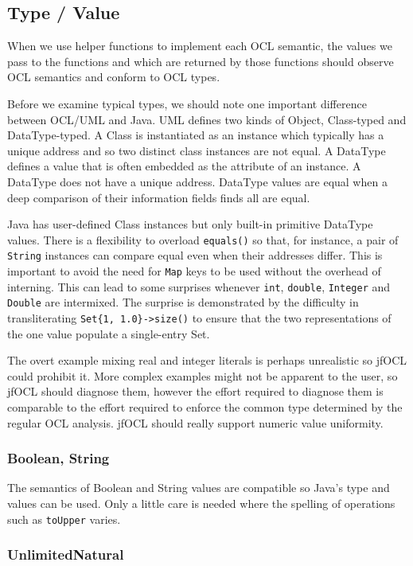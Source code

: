 \documentclass[sigconf]{acmart}
\begin{document}
\subsection{Type / Value}

When we use helper functions to implement each OCL semantic, the values we pass to the functions and which are returned by those functions should observe OCL semantics and conform to OCL types.

Before we examine typical types, we should note one important difference between OCL/UML and Java. UML defines two kinds of Object, Class-typed and DataType-typed. A Class is instantiated as an instance which typically has a unique address and so two distinct class instances are not equal. A DataType defines a value that is often embedded as the attribute of an instance. A DataType does not have a unique address. DataType values are equal when a deep comparison of their information fields finds all are equal.

Java has user-defined Class instances but only built-in primitive DataType values. There is a flexibility to overload \verb|equals()| so that, for instance, a pair of \verb|String| instances can compare equal even when their addresses differ. This is important to avoid the need for \verb|Map| keys to be used without the overhead of interning. This can lead to some surprises whenever \verb|int|, \verb|double|, \verb|Integer| and \verb|Double| are intermixed.
The surprise is demonstrated by the difficulty in transliterating \verb|Set{1, 1.0}->size()| to ensure that the two representations of the one value populate a single-entry Set.

The overt example mixing real and integer literals is perhaps unrealistic so jfOCL could prohibit it. More complex examples might not be apparent to the user, so jfOCL should diagnose them, however the effort required to diagnose them is comparable to the effort required to enforce the common type determined by the regular OCL analysis. jfOCL should really support numeric value uniformity.

\subsubsection{Boolean, String}

The semantics of Boolean and String values are compatible so Java's type and values can be used. Only a little care is needed where the spelling of operations such as \verb|toUpper| varies.

\subsubsection{UnlimitedNatural}
\end{document}
